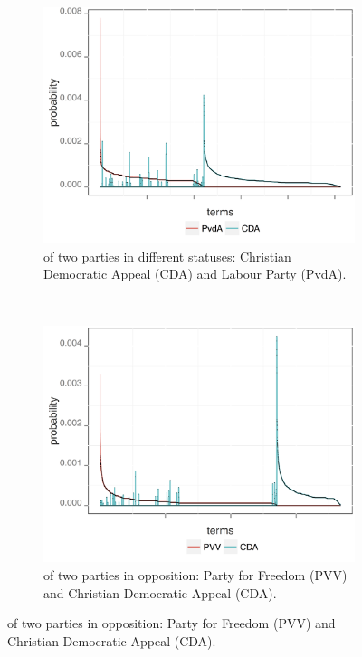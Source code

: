 \begin{figure}[!t]
        \centering
        \begin{subfigure}[b]{0.32\textwidth}
\includegraphics[width=\linewidth]{02-part-01/chapter-03/figs_and_tables/img_PvdA-CDA.png}
\caption{\label{fig:HSPCO} \achswlm of two parties in different statuses: Christian Democratic Appeal (CDA) and Labour Party (PvdA).}
        \end{subfigure}
        ~ 
        \begin{subfigure}[b]{0.32\textwidth}
\centering
\includegraphics[width=\linewidth]{02-part-01/chapter-03/figs_and_tables/img_PVV-CDA.png}
\caption{\label{fig:HSPOO} \achswlm of two parties in opposition: Party for Freedom (PVV) and Christian Democratic Appeal (CDA).}

\end{subfigure}
\end{figure}

